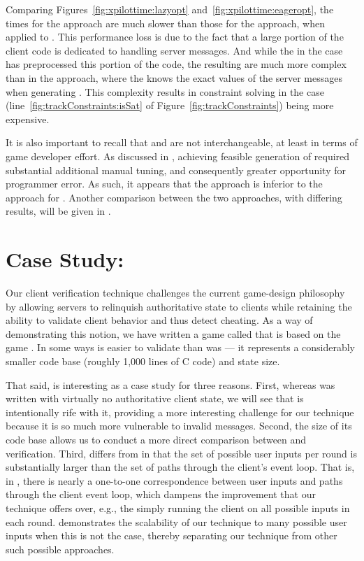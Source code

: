 Comparing
Figures~\ref{fig:xpilottime:lazyopt} and~\ref{fig:xpilottime:eageropt},
the times for the \eager approach are much slower than those
for the \lazy approach, when applied to \xpilot.  This performance
loss is due to the fact that a large portion of the \xpilot client
code is dedicated to handling server messages.  And while the
\verifier in the \eager case has preprocessed this portion of the
code, the resulting \pathsegcons are much more complex than in the
\lazy approach, where the \verifier knows the exact values of the
server messages when generating \pathsegcons.  This complexity results
in constraint solving in the \eager case
(line~\ref{fig:trackConstraints:isSat} of
Figure~\ref{fig:trackConstraints}) being more expensive.

It is also important to recall that \lazy and \eager are not
interchangeable, at least in terms of game developer effort.  As
discussed in , achieving feasible
generation of \eager \pathsegcons required substantial additional
manual tuning, and consequently greater opportunity for programmer
error.  As such, it appears that the \eager approach is inferior to
the \lazy approach for \xpilot.  Another comparison between the two
approaches, with differing results, will be given in
.

\section{Case Study: \capman}
\label{sec:scv:capman}

Our client verification technique challenges the current game-design
philosophy by allowing servers to relinquish authoritative state to
clients while retaining the ability to validate client behavior and
thus detect cheating.  As a way of demonstrating this notion, we have
written a game called \capman that is based on the game \pacman.  In
some ways \capman is easier to validate than \xpilot was --- it
represents a considerably smaller code base (roughly 1,000 lines
of C code) and state size.

That said, \capman is interesting as a case study for three reasons.
First, whereas \xpilot was written with virtually no authoritative
client state, we will see that \capman is intentionally rife with it,
providing a more interesting challenge for our technique because it is
so much more vulnerable to invalid messages.  Second, the size of its
code base allows us to conduct a more direct comparison between \lazy
and \eager verification.  Third, \capman differs from \xpilot in that
the set of possible user inputs per round is substantially larger than
the set of paths through the client's event loop.  That is, in
\xpilot, there is nearly a one-to-one correspondence between user
inputs and paths through the client event loop, which dampens the
improvement that our technique offers over, e.g., the \verifier simply
running the client on all possible inputs in each round.  \capman
demonstrates the scalability of our technique to many possible user
inputs when this is not the case, thereby separating our technique
from other such possible approaches.

